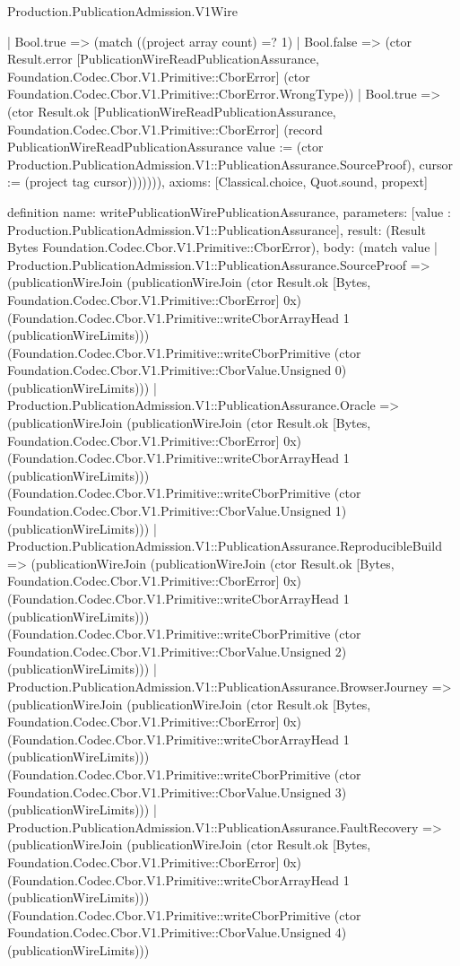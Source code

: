 \begin{lexlean}{Production.PublicationAdmission.V1Wire}
\begin{semanticmodule}
{        | Bool.true => (match ((project array count) =? 1)
          | Bool.false => (ctor Result.error [PublicationWireReadPublicationAssurance, Foundation.Codec.Cbor.V1.Primitive::CborError] (ctor Foundation.Codec.Cbor.V1.Primitive::CborError.WrongType))
          | Bool.true => (ctor Result.ok [PublicationWireReadPublicationAssurance, Foundation.Codec.Cbor.V1.Primitive::CborError] (record PublicationWireReadPublicationAssurance {value := (ctor Production.PublicationAdmission.V1::PublicationAssurance.SourceProof), cursor := (project tag cursor)})))))),
  axioms: [Classical.choice, Quot.sound, propext]
}

definition{
  name: writePublicationWirePublicationAssurance,
  parameters: [value : Production.PublicationAdmission.V1::PublicationAssurance],
  result: (Result Bytes Foundation.Codec.Cbor.V1.Primitive::CborError),
  body: (match value
    | Production.PublicationAdmission.V1::PublicationAssurance.SourceProof => (publicationWireJoin (publicationWireJoin (ctor Result.ok [Bytes, Foundation.Codec.Cbor.V1.Primitive::CborError] 0x) (Foundation.Codec.Cbor.V1.Primitive::writeCborArrayHead 1 (publicationWireLimits))) (Foundation.Codec.Cbor.V1.Primitive::writeCborPrimitive (ctor Foundation.Codec.Cbor.V1.Primitive::CborValue.Unsigned 0) (publicationWireLimits)))
    | Production.PublicationAdmission.V1::PublicationAssurance.Oracle => (publicationWireJoin (publicationWireJoin (ctor Result.ok [Bytes, Foundation.Codec.Cbor.V1.Primitive::CborError] 0x) (Foundation.Codec.Cbor.V1.Primitive::writeCborArrayHead 1 (publicationWireLimits))) (Foundation.Codec.Cbor.V1.Primitive::writeCborPrimitive (ctor Foundation.Codec.Cbor.V1.Primitive::CborValue.Unsigned 1) (publicationWireLimits)))
    | Production.PublicationAdmission.V1::PublicationAssurance.ReproducibleBuild => (publicationWireJoin (publicationWireJoin (ctor Result.ok [Bytes, Foundation.Codec.Cbor.V1.Primitive::CborError] 0x) (Foundation.Codec.Cbor.V1.Primitive::writeCborArrayHead 1 (publicationWireLimits))) (Foundation.Codec.Cbor.V1.Primitive::writeCborPrimitive (ctor Foundation.Codec.Cbor.V1.Primitive::CborValue.Unsigned 2) (publicationWireLimits)))
    | Production.PublicationAdmission.V1::PublicationAssurance.BrowserJourney => (publicationWireJoin (publicationWireJoin (ctor Result.ok [Bytes, Foundation.Codec.Cbor.V1.Primitive::CborError] 0x) (Foundation.Codec.Cbor.V1.Primitive::writeCborArrayHead 1 (publicationWireLimits))) (Foundation.Codec.Cbor.V1.Primitive::writeCborPrimitive (ctor Foundation.Codec.Cbor.V1.Primitive::CborValue.Unsigned 3) (publicationWireLimits)))
    | Production.PublicationAdmission.V1::PublicationAssurance.FaultRecovery => (publicationWireJoin (publicationWireJoin (ctor Result.ok [Bytes, Foundation.Codec.Cbor.V1.Primitive::CborError] 0x) (Foundation.Codec.Cbor.V1.Primitive::writeCborArrayHead 1 (publicationWireLimits))) (Foundation.Codec.Cbor.V1.Primitive::writeCborPrimitive (ctor Foundation.Codec.Cbor.V1.Primitive::CborValue.Unsigned 4) (publicationWireLimits)))
}
\end{semanticmodule}
\end{lexlean}
